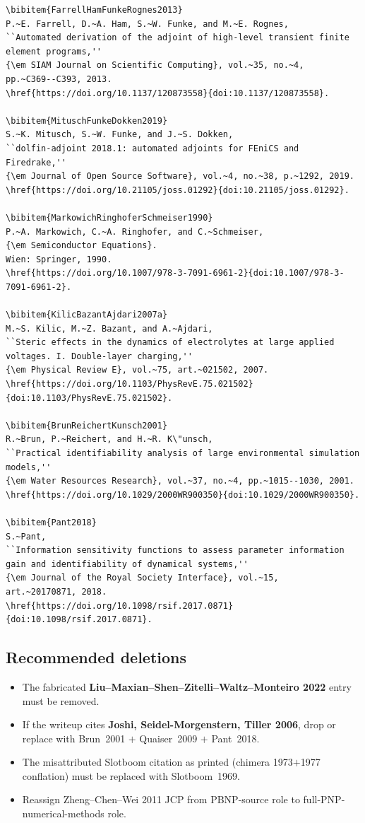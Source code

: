 \documentclass[11pt]{article}
\begin{document}
\begin{lstlisting}[style=bibstyle]
\bibitem{FarrellHamFunkeRognes2013}
P.~E. Farrell, D.~A. Ham, S.~W. Funke, and M.~E. Rognes,
``Automated derivation of the adjoint of high-level transient finite
element programs,''
{\em SIAM Journal on Scientific Computing}, vol.~35, no.~4,
pp.~C369--C393, 2013.
\href{https://doi.org/10.1137/120873558}{doi:10.1137/120873558}.

\bibitem{MituschFunkeDokken2019}
S.~K. Mitusch, S.~W. Funke, and J.~S. Dokken,
``dolfin-adjoint 2018.1: automated adjoints for FEniCS and Firedrake,''
{\em Journal of Open Source Software}, vol.~4, no.~38, p.~1292, 2019.
\href{https://doi.org/10.21105/joss.01292}{doi:10.21105/joss.01292}.

\bibitem{MarkowichRinghoferSchmeiser1990}
P.~A. Markowich, C.~A. Ringhofer, and C.~Schmeiser,
{\em Semiconductor Equations}.
Wien: Springer, 1990.
\href{https://doi.org/10.1007/978-3-7091-6961-2}{doi:10.1007/978-3-7091-6961-2}.

\bibitem{KilicBazantAjdari2007a}
M.~S. Kilic, M.~Z. Bazant, and A.~Ajdari,
``Steric effects in the dynamics of electrolytes at large applied
voltages. I. Double-layer charging,''
{\em Physical Review E}, vol.~75, art.~021502, 2007.
\href{https://doi.org/10.1103/PhysRevE.75.021502}{doi:10.1103/PhysRevE.75.021502}.

\bibitem{BrunReichertKunsch2001}
R.~Brun, P.~Reichert, and H.~R. K\"unsch,
``Practical identifiability analysis of large environmental simulation
models,''
{\em Water Resources Research}, vol.~37, no.~4, pp.~1015--1030, 2001.
\href{https://doi.org/10.1029/2000WR900350}{doi:10.1029/2000WR900350}.

\bibitem{Pant2018}
S.~Pant,
``Information sensitivity functions to assess parameter information
gain and identifiability of dynamical systems,''
{\em Journal of the Royal Society Interface}, vol.~15,
art.~20170871, 2018.
\href{https://doi.org/10.1098/rsif.2017.0871}{doi:10.1098/rsif.2017.0871}.
\end{lstlisting}

\subsection{Recommended deletions}

\begin{itemize}
\item The fabricated \textbf{Liu--Maxian--Shen--Zitelli--Waltz--Monteiro 2022}
      entry must be removed.
\item If the writeup cites \textbf{Joshi, Seidel-Morgenstern, Tiller 2006},
      drop or replace with Brun~2001 $+$ Quaiser~2009 $+$ Pant~2018.
\item The misattributed Slotboom citation as printed (chimera 1973$+$1977
      conflation) must be replaced with Slotboom~1969.
\item Reassign Zheng--Chen--Wei 2011 JCP from PBNP-source role to
      full-PNP-numerical-methods role.
\end{itemize}
\end{document}
